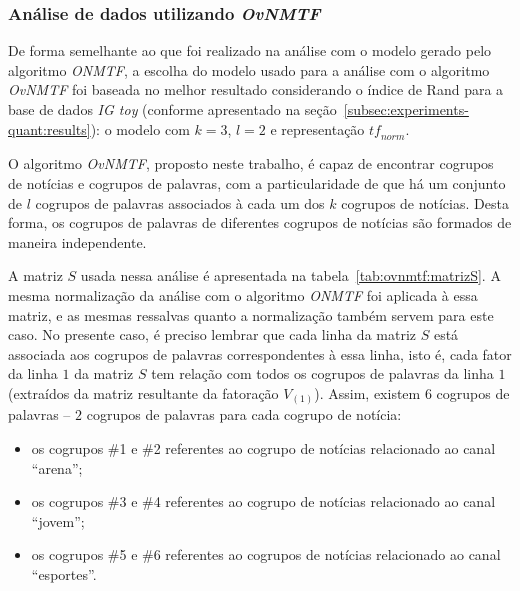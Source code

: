 \documentclass[
    12pt,                %
    oneside,            %
    a4paper,            %
    english,            %
    brazil                %
    ]{abntex2ppgsi}
\begin{document}
\subsubsection{Análise de dados utilizando \textit{OvNMTF}}

De forma semelhante ao que foi realizado na análise com o modelo gerado pelo algoritmo \textit{ONMTF}, a escolha do modelo usado para a análise com o algoritmo \textit{OvNMTF} foi baseada no melhor resultado considerando o índice de Rand para a base de dados \textit{IG toy} (conforme apresentado na seção~\ref{subsec:experiments-quant:results}): o modelo com $k = 3$, $l = 2$ e representação $\textit{tf}_{norm}$.

O algoritmo \textit{OvNMTF}, proposto neste trabalho, é capaz de encontrar cogrupos de notícias e cogrupos de palavras, com a particularidade de que há um conjunto de $l$ cogrupos de palavras associados à cada um dos $k$ cogrupos de notícias. Desta forma, os cogrupos de palavras de diferentes cogrupos de notícias são formados de maneira independente.


A matriz $S$ usada nessa análise é apresentada na tabela~\ref{tab:ovnmtf:matrizS}.
A mesma normalização da análise com o algoritmo \textit{ONMTF} foi aplicada à essa matriz, e as mesmas ressalvas quanto a normalização também servem para este caso. No presente caso, é preciso lembrar que cada linha da matriz $S$ está associada aos cogrupos de palavras correspondentes à essa linha, isto é, cada fator da linha $1$ da matriz $S$ tem relação com todos os cogrupos de palavras da linha $1$ (extraídos da matriz resultante da fatoração $V_{(1)}$). Assim, existem $6$ cogrupos de palavras -- $2$ cogrupos de palavras para cada cogrupo de notícia:

\begin{itemize}
\item os cogrupos \#1 e \#2 referentes ao cogrupo de notícias relacionado ao canal ``arena'';
\item os cogrupos \#3 e \#4 referentes ao cogrupo de notícias relacionado ao canal ``jovem'';
\item os cogrupos \#5 e \#6 referentes ao cogrupos de notícias relacionado ao canal ``esportes''.
\end{itemize}
\end{document}
